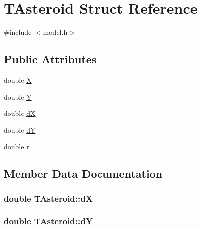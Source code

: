\hypertarget{struct_t_asteroid}{}\section{T\+Asteroid Struct Reference}
\label{struct_t_asteroid}


{\ttfamily \#include $<$model.\+h$>$}

\subsection*{Public Attributes}
\begin{DoxyCompactItemize}
\item 
double \hyperlink{struct_t_asteroid_a38dc61b36ba6e04e2c66b29fe37fcf50}{X}
\item 
double \hyperlink{struct_t_asteroid_ade59ba9e0d33e907e4a501b0054ebead}{Y}
\item 
double \hyperlink{struct_t_asteroid_abced2735992f44e6d08b03f3cb500082}{dX}
\item 
double \hyperlink{struct_t_asteroid_aa64a00d1477995c7a7e2568432adf4b5}{dY}
\item 
double \hyperlink{struct_t_asteroid_a357dfe7bec4bc3a95610ff961d1a2c39}{r}
\end{DoxyCompactItemize}


\subsection{Member Data Documentation}
\subsubsection[{\texorpdfstring{dX}{dX}}]{\setlength{\rightskip}{0pt plus 5cm}double T\+Asteroid\+::dX}\hypertarget{struct_t_asteroid_abced2735992f44e6d08b03f3cb500082}{}\label{struct_t_asteroid_abced2735992f44e6d08b03f3cb500082}
\subsubsection[{\texorpdfstring{dY}{dY}}]{\setlength{\rightskip}{0pt plus 5cm}double T\+Asteroid\+::dY}\hypertarget{struct_t_asteroid_aa64a00d1477995c7a7e2568432adf4b5}{}\label{struct_t_asteroid_aa64a00d1477995c7a7e2568432adf4b5}
